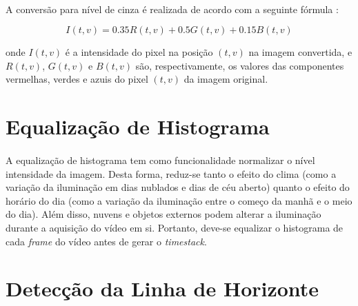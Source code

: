 \paragraph{}A conversão para nível de cinza é realizada de acordo com a seguinte fórmula \cite{Griffith14}:

\[
  I(t, v) = 0.35R(t, v) + 0.5G(t, v) + 0.15B(t, v)
\]

\noindent{}onde \(I(t,v)\) é a intensidade do pixel na posição \((t,v)\) na imagem convertida, e \(R(t,v)\), \(G(t,v)\) e \(B(t,v)\) são, respectivamente, os valores das componentes vermelhas, verdes e azuis do pixel \((t,v)\) da imagem original.

\section{Equalização de Histograma}

\paragraph{}A equalização de histograma tem como funcionalidade normalizar o nível intensidade da imagem. Desta forma, reduz-se tanto o efeito do clima (como a variação da iluminação em dias nublados e dias de céu aberto) quanto o efeito do horário do dia (como a variação da iluminação entre o começo da manhã e o meio do dia). Além disso, nuvens e objetos externos podem alterar a iluminação durante a aquisição do vídeo em si. Portanto, deve-se equalizar o histograma de cada \textit{frame} do vídeo antes de gerar o \textit{timestack}.


\section{Detecção da Linha de Horizonte}

